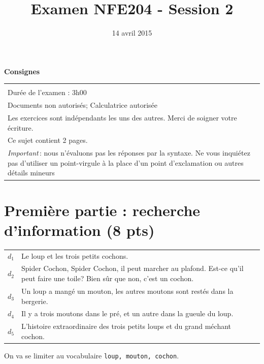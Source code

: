 \documentclass[11pt,a4paper]{article}
\begin{document}
\title{Examen NFE204 - Session 2}
\date{14 avril 2015}

\maketitle

\begin{center}
{\bf \Large Consignes}\\
\begin{tabular}{| p{15cm} |}
\hline
\\
Dur\'ee de l'examen : 3h00\\
Documents non autoris\'es;  Calculatrice autoris\'ee\\

Les exercices sont indépendants les uns des autres. Merci de soigner votre écriture.\\
Ce sujet contient 2 pages.\\


\textit{Important}\,: nous n'évaluons pas les réponses par la syntaxe. Ne vous
inquiétez pas d'utiliser un point-virgule à la place d'un point d'exclamation ou
autres détails mineurs
\\
\hline
\end{tabular}
\end{center}

\section*{Première partie : recherche d'information (8 pts)}


\begin{tabular}{lp{15cm}}
     $d_1$&Le loup et les trois petits cochons.\\
     $d_2$&Spider Cochon, Spider Cochon, il peut marcher au plafond. Est-ce qu'il
         peut faire une toile? Bien sûr que non, c'est un cochon.\\
     $d_3$&Un loup a mangé un mouton, les autres moutons sont restés dans la bergerie.\\
     $d_4$&Il y a trois moutons dans le pré, et un autre dans la gueule du loup.\\
     $d_5$&L'histoire extraordinaire des trois petits loups et du grand méchant cochon.\\ 
\end{tabular}

\smallskip

On va se limiter au vocabulaire \texttt{loup, mouton, cochon}.
\end{document}
